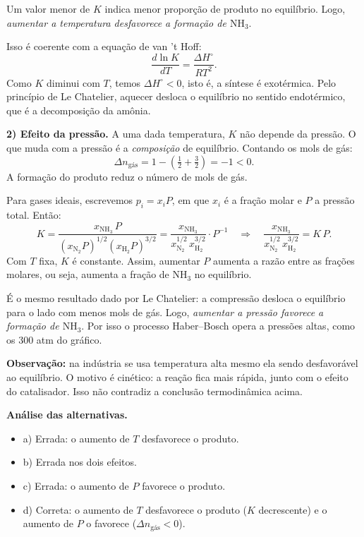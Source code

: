 \documentclass{article}%
\begin{document}
Um valor menor de $K$ indica menor proporção de produto no equilíbrio. Logo, \emph{aumentar a temperatura desfavorece a formação de $\mathrm{NH_3}$}.

Isso é coerente com a equação de van 't Hoff:
\[
\frac{d\ln K}{dT}=\frac{\Delta H^\circ}{RT^2}.
\]
Como $K$ diminui com $T$, temos $\Delta H^\circ<0$, isto é, a síntese é exotérmica. Pelo princípio de Le Chatelier, aquecer desloca o equilíbrio no sentido endotérmico, que é a decomposição da amônia.

\medskip
\textbf{2) Efeito da pressão.}
A uma dada temperatura, $K$ não depende da pressão. O que muda com a pressão é a \emph{composição} de equilíbrio. Contando os mols de gás:
\[
\Delta n_{\text{gás}} = 1-\left(\tfrac{1}{2}+\tfrac{3}{2}\right) = -1 < 0 .
\]
A formação do produto reduz o número de mols de gás.

Para gases ideais, escrevemos $p_i = x_i P$, em que $x_i$ é a fração molar e $P$ a pressão total. Então:
\[
K=\frac{x_{\mathrm{NH_3}}\,P}{\left(x_{\mathrm{N_2}}P\right)^{1/2}\left(x_{\mathrm{H_2}}P\right)^{3/2}}
=\frac{x_{\mathrm{NH_3}}}{x_{\mathrm{N_2}}^{1/2}\,x_{\mathrm{H_2}}^{3/2}}\cdot P^{-1}
\quad\Longrightarrow\quad
\frac{x_{\mathrm{NH_3}}}{x_{\mathrm{N_2}}^{1/2}\,x_{\mathrm{H_2}}^{3/2}} = K\,P .
\]
Com $T$ fixa, $K$ é constante. Assim, aumentar $P$ aumenta a razão entre as frações molares, ou seja, aumenta a fração de $\mathrm{NH_3}$ no equilíbrio.

É o mesmo resultado dado por Le Chatelier: a compressão desloca o equilíbrio para o lado com menos mols de gás. Logo, \emph{aumentar a pressão favorece a formação de $\mathrm{NH_3}$}. Por isso o processo Haber--Bosch opera a pressões altas, como os 300 atm do gráfico.

\medskip
\textbf{Observação:} na indústria se usa temperatura alta mesmo ela sendo desfavorável ao equilíbrio. O motivo é cinético: a reação fica mais rápida, junto com o efeito do catalisador. Isso não contradiz a conclusão termodinâmica acima.

\medskip
\textbf{Análise das alternativas.}
\begin{itemize}
\item a) Errada: o aumento de $T$ desfavorece o produto.
\item b) Errada nos dois efeitos.
\item c) Errada: o aumento de $P$ favorece o produto.
\item d) Correta: o aumento de $T$ desfavorece o produto ($K$ decrescente) e o aumento de $P$ o favorece ($\Delta n_{\text{gás}}<0$).
\end{itemize}
\end{document}

